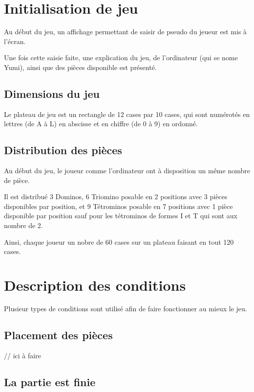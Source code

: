 \documentclass[a4paper, titlepage, french]{report}
\begin{document}
\chapter{Initialisation de jeu}

Au début du jeu, un affichage permettant de saisir de pseudo du jeueur est mis à l'écran.

Une fois cette saisie faite, une explication du jeu, de l'ordinateur (qui se nome Yumi), ainsi que des pièces disponible est présenté.



\section{Dimensions du jeu}

Le plateau de jeu est un rectangle de 12 cases par 10 cases, qui sont numérotés en lettres (de A à L) en abscisse et en chiffre (de 0 à 9) en ordonné.

\section{Distribution des pièces}

Au début du jeu, le joueur comme l'ordinateur ont à disposition un même nombre de pièce.
\bigskip

Il est distribué 3 Dominos, 6 Triomino posable en 2 positions avec 3 pièces disponibles par position, et 9 Tétrominos posable en 7 positions avec 1 pièce disponible par position sauf pour les tétrominos de formes I et T qui sont aux nombre de 2.

Ainsi, chaque joueur un nobre de 60 cases sur un plateau faisant en tout 120 cases.

\chapter{Description des conditions}

Plusieur types de conditions sont utilisé afin de faire fonctionner au mieux le jeu.

\section{Placement des pièces}

\color{red}
// ici à faire
\color{black}


\section{La partie est finie}
\end{document}
